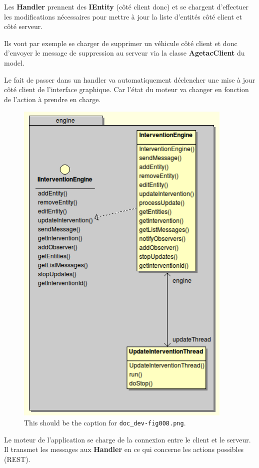 \documentclass{article}
\begin{document}
\vspace{13pt}
{ Les }{ \textbf{Handler}}{  prennent 
des }{ \textbf{IEntity}}{  (côté client donc) et 
se chargent d'effectuer les modifications nécessaires pour mettre à jour la liste 
d'entités côté client et côté serveur.}

Ils vont par exemple se charger de supprimer un véhicule côté 
client et donc d'envoyer le message de suppression au serveur via la classe \textbf{AgetacClient}
du model.

Le fait de passer dans un handler va automatiquement déclencher 
une mise à jour côté client de l'interface graphique. Car l'état du moteur 
va changer en fonction de l'action à prendre en charge.

\begin{figure}[htbp]
\begin{center}
\includegraphics[width=293pt, height=456pt]{doc_dev-fig008.png}
\caption{This should be the caption for \texttt{doc\_dev-fig008.png}.}
\end{center}
\end{figure}

Le moteur de l'application se charge de la connexion entre le 
client et le serveur. Il transmet les messages aux \textbf{Handler}
en ce qui concerne les actions possibles (REST).
\end{document}
